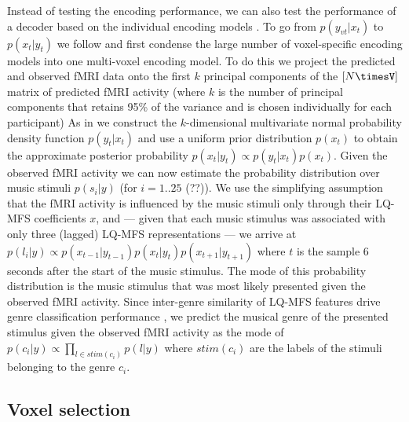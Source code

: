 Instead of testing the encoding performance, we can also test the performance of
a decoder based on the individual encoding models \citet{NG11}. To go from
$p(y_{vt}|x_{t})$ to $p(x_{t}|y_{t})$ we follow \citet{NG09} and first condense
the large number of voxel-specific encoding models into one multi-voxel encoding model.
To do this we project the predicted and observed f{MRI} data onto the first $k$ principal components of the $[N\timesV]$ matrix of predicted f{MRI} activity  (where $k$ is the number of principal components that retains 95\% of the variance and is chosen individually for each participant) 
As in \citet{NG09} we construct the $k$-dimensional multivariate normal
probability density function $p(y_{t}|x_{t})$ and use a uniform prior
distribution $p(x_{t})$ to obtain the approximate posterior probability
$p(x_{t}|y_{t}) \propto p(y_{t}|x_{t})p(x_{t})$. Given the observed f{MRI}
activity we can now estimate the probability distribution over music stimuli
$p(s_{i}|y)$ (for $i=1..25$ (??)). We use the simplifying assumption that the
f{MRI} activity is influenced by the music stimuli only through their LQ-MFS
coefficients $x$, and --- given that each music stimulus was associated with only
three (lagged) LQ-MFS representations --- we arrive at $p(l_{i}|y) \propto
p(x_{t-1}|y_{t-1})p(x_{t}|y_{t})p(x_{t+1}|y_{t+1})$ where $t$ is the sample 6
seconds after the start of the music stimulus. The mode of this probability
distribution is the music stimulus that was most likely presented given the
observed f{MRI} activity. Since inter-genre similarity of LQ-MFS features drive
genre classification performance \citep{CTK+2012}, we predict the musical genre
of the presented stimulus given the observed f{MRI} activity as the mode of $p(c_{i}|y)
\propto \prod\nolimits_{l \in stim(c_{i})} p(l|y)$ where $stim(c_{i})$ are
the labels of the stimuli belonging to the genre $c_{i}$. 


\subsection*{Voxel selection}

